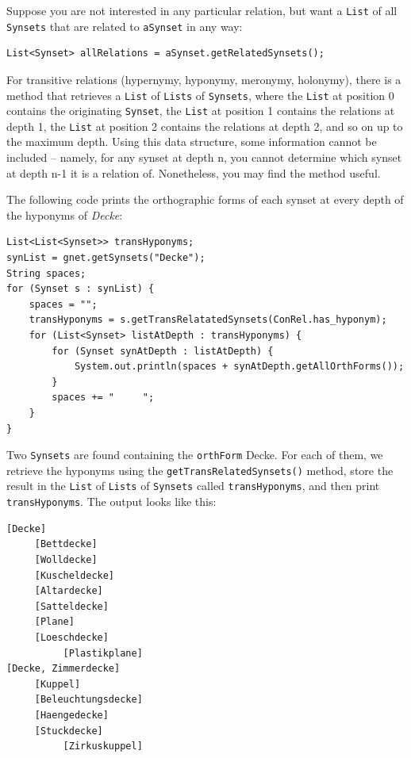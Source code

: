\documentclass[12pt,a4paper,english,utf8]{report}
\begin{document}
Suppose you are not interested in any particular relation, but want a \texttt{List} of all \texttt{Synsets} that are related to \texttt{aSynset} in any way:

\begin{lstlisting}
List<Synset> allRelations = aSynset.getRelatedSynsets();
\end{lstlisting}

For transitive relations (hypernymy, hyponymy, meronymy, holonymy), there is a method that retrieves a \texttt{List} of \texttt{Lists} of \texttt{Synsets}, where the \texttt{List} at position 0 contains the originating \texttt{Synset}, the \texttt{List} at position 1 contains the relations at depth 1, the \texttt{List} at position 2 contains the relations at depth 2, and so on up to the maximum depth. Using this data structure, some information cannot be included – namely, for any synset at depth n, you cannot determine which synset at depth n-1 it is a relation of. Nonetheless, you may find the method useful.

The following code prints the orthographic forms of each synset at every depth of the hyponyms of \emph{Decke}:

\begin{lstlisting}
List<List<Synset>> transHyponyms;
synList = gnet.getSynsets("Decke");
String spaces;
for (Synset s : synList) {
    spaces = "";
    transHyponyms = s.getTransRelatatedSynsets(ConRel.has_hyponym);
    for (List<Synset> listAtDepth : transHyponyms) {
        for (Synset synAtDepth : listAtDepth) {
            System.out.println(spaces + synAtDepth.getAllOrthForms());
        }
        spaces += "     ";
    }
}
\end{lstlisting}

Two \texttt{Synsets} are found containing the \texttt{orthForm} Decke. For each of them, we retrieve the hyponyms using the \texttt{getTransRelatedSynsets()} method, store the result in the \texttt{List} of \texttt{Lists} of \texttt{Synsets} called \texttt{transHyponyms}, and then print \texttt{transHyponyms}. The output looks like this: 

\begin{lstlisting}
[Decke]
     [Bettdecke]
     [Wolldecke]
     [Kuscheldecke]
     [Altardecke]
     [Satteldecke]
     [Plane]
     [Loeschdecke]
          [Plastikplane]
[Decke, Zimmerdecke]
     [Kuppel]
     [Beleuchtungsdecke]
     [Haengedecke]
     [Stuckdecke]
          [Zirkuskuppel]
\end{lstlisting}
\end{document}
